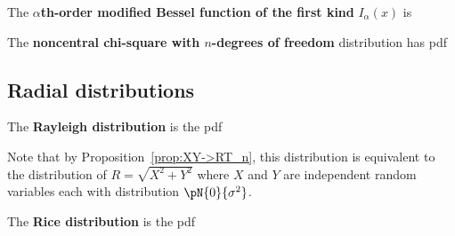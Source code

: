 \begin{definition}
The {\bf $\alpha$th-order modified Bessel function of the first kind}
$I_\alpha(x)$ is
\end{definition}

\begin{definition}
The {\bf noncentral chi-square with $n$-degrees of freedom} distribution has
pdf
\end{definition}

\subsection{Radial distributions}
\begin{definition}
The {\bf Rayleigh distribution} is the pdf
\end{definition}

Note that by Proposition~\ref{prop:XY->RT_n},
this distribution is equivalent to the distribution of 
$R=\sqrt{X^2+Y^2}$ where $X$ and $Y$ are independent random variables
each with distribution $\pN{0}{\sigma^2}$.

\begin{definition}
The {\bf Rice distribution} is the pdf
\end{definition}





